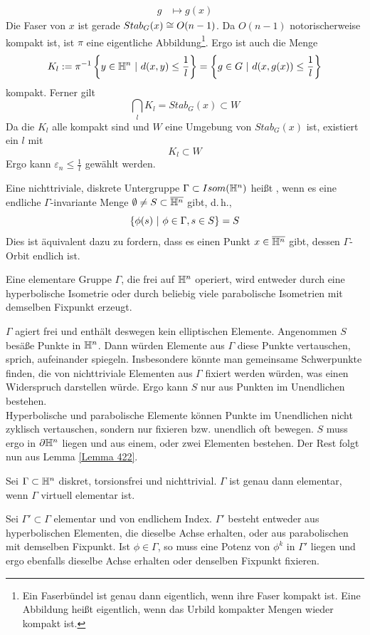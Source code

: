 \documentclass{book}
\renewcommand{\epsilon}{\varepsilon}
\begin{document}
\begin{Beweis}{}
\begin{itemize}
\begin{align*}
	g & \longmapsto g(x)
	\end{align*}
	Die Faser von $x$ ist gerade $Stab_G(x) \overset{}{\cong} O(n-1)$. Da $O(n-1)$ notorischerweise kompakt ist, ist $\pi$ eine eigentliche Abbildung\footnote{
Ein Faserbündel ist genau dann eigentlich, wenn ihre Faser kompakt ist. Eine Abbildung heißt eigentlich, wenn das Urbild kompakter Mengen wieder kompakt ist.	
}. Ergo ist auch die Menge
\[ K_l := \pi\i\set{y \in \H^n}{ d(x,y) \leq \frac{1}{l} } = \set{g \in G}{d(x, g(x)) \leq \frac{1}{l}} \]
kompakt. Ferner gilt
\[ \bigcap_l K_l = Stab_G(x) \subset W \]
Da die $K_l$ alle kompakt sind und $W$ eine Umgebung von $Stab_G(x)$ ist, existiert ein $l$ mit
\[ K_l \subset W \]
Ergo kann $\epsilon_n \leq \frac{1}{l}$ gewählt werden.
	\end{itemize}
	
\end{Beweis}

\Def{}
Eine nichttriviale, diskrete Untergruppe $\Gamma \subset Isom(\mathbb{H}^n)$ heißt , wenn es eine endliche $\Gamma$-invariante Menge $\emptyset \neq S \subset \overline{\mathbb{H}^n}$ gibt, d.\,h.,
\[ \set{\phi(s) }{\phi \in \Gamma, s\in S} = S \]
Dies ist äquivalent dazu zu fordern, dass es einen Punkt $x \in \overline{\mathbb{H}^n}$ gibt, dessen $\Gamma$-Orbit endlich ist.

\Prop{}
Eine elementare Gruppe $\Gamma$, die frei auf $\mathbb{H}^n$ operiert, wird entweder durch eine hyperbolische Isometrie oder durch beliebig viele parabolische Isometrien mit demselben Fixpunkt erzeugt.
\begin{Beweis}{}
$\Gamma$ agiert frei und enthält deswegen kein elliptischen Elemente. Angenommen $S$ besäße Punkte in $\mathbb{H}^n$. Dann würden Elemente aus $\Gamma$ diese Punkte vertauschen, sprich, aufeinander spiegeln. Insbesondere könnte man gemeinsame Schwerpunkte finden, die von nichttriviale Elementen aus $\Gamma$ fixiert werden würden, was einen Widerspruch darstellen würde. Ergo kann $S$ nur aus Punkten im Unendlichen bestehen.\\
Hyperbolische und parabolische Elemente können Punkte im Unendlichen nicht zyklisch vertauschen, sondern nur fixieren bzw. unendlich oft bewegen. $S$ muss ergo in $\partial \mathbb{H}^n$ liegen und aus einem, oder zwei Elementen bestehen. Der Rest folgt nun aus Lemma \ref{Lemma 422}.
\end{Beweis}

\Prop{}
Sei $\Gamma \subset \mathbb{H}^n$ diskret, torsionsfrei und nichttrivial. $\Gamma$ ist genau dann elementar, wenn $\Gamma$ virtuell elementar ist.
\begin{Beweis}{}
	Sei $\Gamma' \subset \Gamma$ elementar und von endlichem Index. $\Gamma'$ besteht entweder aus hyperbolischen Elementen, die dieselbe Achse erhalten, oder aus parabolischen mit demselben Fixpunkt. Ist $\phi \in \Gamma$, so muss eine Potenz von $\phi^k$ in $\Gamma'$ liegen und ergo ebenfalls dieselbe Achse erhalten oder denselben Fixpunkt fixieren.
\end{Beweis}
\end{document}
